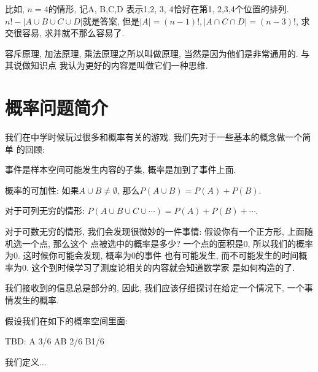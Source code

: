 比如, $n=4$的情形, 记A, B,C,D 表示1,2, 3, 4恰好在第1, 2,3,4个位置的排列. 
$n!-|A\cup B\cup C\cup D|$就是答案, 但是$|A|=(n-1)!, |A\cap C\cap D|=
(n-3)!$, 求交很容易, 求并就不那么容易了. 

容斥原理, 加法原理, 乘法原理之所以叫做原理, 当然是因为他们是非常通用的. 与其说做知识点
我认为更好的内容是叫做它们一种思维. 


\section{概率问题简介} 

 我们在中学时候玩过很多和概率有关的游戏. 我们先对于一些基本的概念做一个简单
的回顾: 

\begin{definition}
    事件是样本空间可能发生内容的子集, 概率是加到了事件上面. 
\end{definition}

\begin{axiom}
    概率的可加性: 如果$A\cup B\neq \emptyset$, 那么$P(A\cup B)=P(A)+P(B)$. 

    对于可列无穷的情形: $P(A\cup B\cup C\cup\cdots)=P(A)+P(B)+\cdots$. 
\end{axiom}
对于可数无穷的情形, 我们会发现很微妙的一件事情: 假设你有一个正方形, 上面随机选一个点, 那么这个
点被选中的概率是多少? 一个点的面积是0, 所以我们的概率为0. 这时候你可能会发现, 概率为0的事件
也有可能发生, 而不可能发生的时间概率为0. 这个到时候学习了测度论相关的内容就会知道数学家
是如何构造的了. 

我们接收到的信息总是部分的, 因此, 我们应该仔细探讨在给定一个情况下, 一个事情发生的概率. 

假设我们在如下的概率空间里面: 

TBD: A 3/6 AB 2/6 B1/6

我们定义...